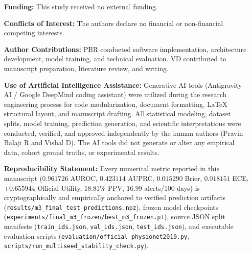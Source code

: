 \documentclass[11pt,a4paper]{article}
\begin{document}
\textbf{Funding:} This study received no external funding.

\textbf{Conflicts of Interest:} The authors declare no financial or non-financial competing interests.

\textbf{Author Contributions:} PBR conducted software implementation, architecture development, model training, and technical evaluation. VD contributed to manuscript preparation, literature review, and writing.

\textbf{Use of Artificial Intelligence Assistance:} Generative AI tools (Antigravity AI / Google DeepMind coding assistant) were utilized during the research engineering process for code modularization, document formatting, LaTeX structural layout, and manuscript drafting. All statistical modeling, dataset splits, model training, prediction generation, and scientific interpretations were conducted, verified, and approved independently by the human authors (Pravin Balaji R and Vishal D). The AI tools did not generate or alter any empirical data, cohort ground truths, or experimental results.

\textbf{Reproducibility Statement:} Every numerical metric reported in this manuscript ($0.961726$ AUROC, $0.423114$ AUPRC, $0.015290$ Brier, $0.018151$ ECE, $+0.655944$ Official Utility, $18.81\%$ PPV, $16.99$ alerts/100 days) is cryptographically and empirically anchored to verified prediction artifacts (\texttt{results/m3\_final\_test\_predictions.npz}), frozen model checkpoints (\texttt{experiments/final\_m3\_frozen/best\_m3\_frozen.pt}), source JSON split manifests (\texttt{train\_ids.json}, \texttt{val\_ids.json}, \texttt{test\_ids.json}), and executable evaluation scripts (\texttt{evaluation/official\_physionet2019.py}, \texttt{scripts/run\_multiseed\_stability\_check.py}).
\end{document}
